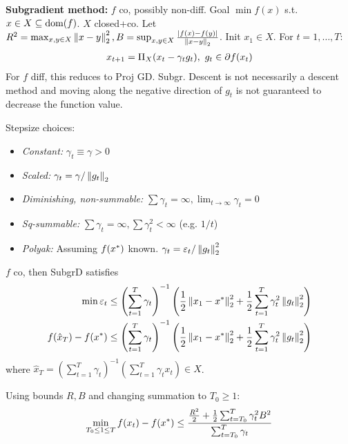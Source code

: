 \textbf{Subgradient method:} $f$ co, possibly non-diff. Goal $\min f(x)$ s.t. $x \in X \subseteq \operatorname*{\text{dom}}(f)$. $X$ closed+co. Let $R^2 = \max_{x,y \in X} \left\lVert x - y \right\rVert_2^2, B = \sup_{x,y \in X} \frac{\left\lvert f(x) - f(y) \right\rvert}{\left\lVert x - y \right\rVert_2}$. Init $x_1 \in X$. For $t = 1, \dots, T$:
\begin{align*}
    x_{{t+1}} = \Pi_X (x_t - \gamma_t g_t), \ g_t \in \partial f(x_t)
\end{align*}
For $f$ diff, this reduces to Proj GD. Subgr. Descent is not necessarily a descent method and moving along the negative direction of $g_t$ is not guaranteed to decrease the function value.

Stepsize choices:
\begin{itemize}
    \item \textit{Constant:} $\gamma_t \equiv \gamma > 0$
    \item \textit{Scaled:} $\gamma_t = \gamma / \left\lVert g_t \right\rVert_2$
    \item \textit{Diminishing, non-summable:} $\sum \gamma_t = \infty, \lim_{t\to\infty} \gamma_t = 0$
    \item \textit{Sq-summable:} $\sum \gamma_t = \infty, \sum \gamma_t^2 < \infty$ (e.g. $1/t$)
    \item \textit{Polyak:} Assuming $f(x^*)$ known. $\gamma_t = \varepsilon_t / \left\lVert g_t \right\rVert_2^2$
\end{itemize}

$f$ co, then SubgrD satisfies
\begin{align*}
    \min \varepsilon_t \leq \left( \sum_{t=1}^{T} \gamma_t \right)^{-1} \left( \frac{1}{2} \left\lVert x_1 - x^* \right\rVert_2^2 + \frac{1}{2} \sum_{t=1}^{T} \gamma_t^2 \left\lVert g_t \right\rVert_2^2 \right) \\
    f(\hat{x}_T) - f(x^*) \leq \left( \sum_{t=1}^{T} \gamma_t \right)^{-1} \left( \frac{1}{2} \left\lVert x_1 - x^* \right\rVert_2^2 + \frac{1}{2} \sum_{t=1}^{T} \gamma_t^2 \left\lVert g_t \right\rVert_2^2 \right) 
\end{align*}
where $\hat{x}_T = \left( \sum_{t=1}^{T} \gamma_t \right)^{-1} \left( \sum_{t=1}^{T} \gamma_t x_t \right) \in X$.

Using bounds $R, B$ and changing summation to $T_0 \geq 1$:
\begin{align*}
    \min_{T_0 \leq 1 \leq T} f(x_t) - f(x^*) \leq \frac{\frac{R^2}{2}+ \frac{1}{2}\sum_{t=T_0}^{T}\gamma_t^2 B^2}{\sum_{t=T_0}^{T} \gamma_t}
\end{align*}


